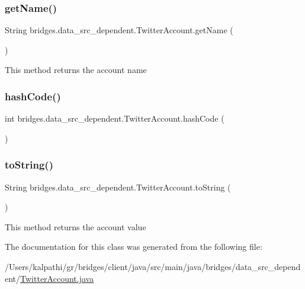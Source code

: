 \subsubsection{\texorpdfstring{get\+Name()}{getName()}}
{\footnotesize\ttfamily String bridges.\+data\+\_\+src\+\_\+dependent.\+Twitter\+Account.\+get\+Name (\begin{DoxyParamCaption}{ }\end{DoxyParamCaption})}

This method returns the account name \mbox{\label{classbridges_1_1data__src__dependent_1_1_twitter_account_a2f89f6f336b1bd39f0cf3aa444c76885}} 
\subsubsection{\texorpdfstring{hash\+Code()}{hashCode()}}
{\footnotesize\ttfamily int bridges.\+data\+\_\+src\+\_\+dependent.\+Twitter\+Account.\+hash\+Code (\begin{DoxyParamCaption}{ }\end{DoxyParamCaption})}

\mbox{\label{classbridges_1_1data__src__dependent_1_1_twitter_account_af4dd5dfe1a1556fa57f917fb24d8d6f2}} 
\subsubsection{\texorpdfstring{to\+String()}{toString()}}
{\footnotesize\ttfamily String bridges.\+data\+\_\+src\+\_\+dependent.\+Twitter\+Account.\+to\+String (\begin{DoxyParamCaption}{ }\end{DoxyParamCaption})}

This method returns the account value 

The documentation for this class was generated from the following file\+:\begin{DoxyCompactItemize}
\item 
/\+Users/kalpathi/gr/bridges/client/java/src/main/java/bridges/data\+\_\+src\+\_\+dependent/\mbox{\hyperlink{_twitter_account_8java}{Twitter\+Account.\+java}}\end{DoxyCompactItemize}
